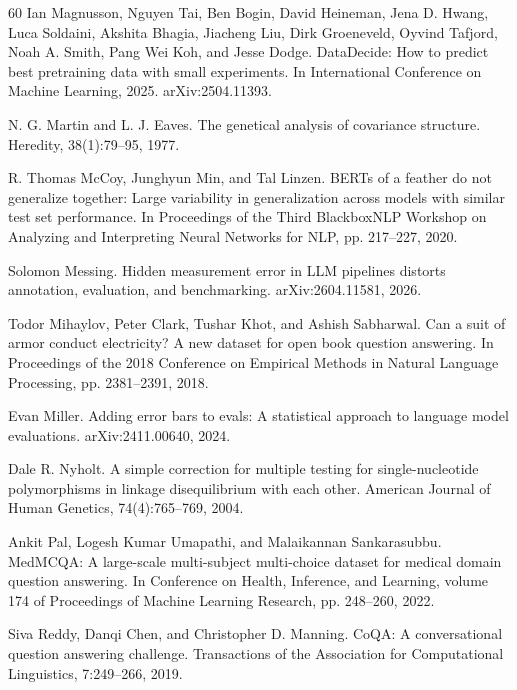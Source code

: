 \begin{thebibliography}{60}
Ian Magnusson, Nguyen Tai, Ben Bogin, David Heineman, Jena D. Hwang, Luca Soldaini, Akshita Bhagia, Jiacheng Liu, Dirk Groeneveld, Oyvind Tafjord, Noah A. Smith, Pang Wei Koh, and Jesse Dodge. DataDecide: How to predict best pretraining data with small experiments. In International Conference on Machine Learning, 2025. arXiv:2504.11393.

N. G. Martin and L. J. Eaves. The genetical analysis of covariance structure. Heredity, 38(1):79--95, 1977.

R. Thomas McCoy, Junghyun Min, and Tal Linzen. BERTs of a feather do not generalize together: Large variability in generalization across models with similar test set performance. In Proceedings of the Third BlackboxNLP Workshop on Analyzing and Interpreting Neural Networks for NLP, pp. 217--227, 2020.

Solomon Messing. Hidden measurement error in LLM pipelines distorts annotation, evaluation, and benchmarking. arXiv:2604.11581, 2026.

Todor Mihaylov, Peter Clark, Tushar Khot, and Ashish Sabharwal. Can a suit of armor conduct electricity? A new dataset for open book question answering. In Proceedings of the 2018 Conference on Empirical Methods in Natural Language Processing, pp. 2381--2391, 2018.

Evan Miller. Adding error bars to evals: A statistical approach to language model evaluations. arXiv:2411.00640, 2024.

Dale R. Nyholt. A simple correction for multiple testing for single-nucleotide polymorphisms in linkage disequilibrium with each other. American Journal of Human Genetics, 74(4):765--769, 2004.

Ankit Pal, Logesh Kumar Umapathi, and Malaikannan Sankarasubbu. MedMCQA: A large-scale multi-subject multi-choice dataset for medical domain question answering. In Conference on Health, Inference, and Learning, volume 174 of Proceedings of Machine Learning Research, pp. 248--260, 2022.

Siva Reddy, Danqi Chen, and Christopher D. Manning. CoQA: A conversational question answering challenge. Transactions of the Association for Computational Linguistics, 7:249--266, 2019.


\end{thebibliography}

